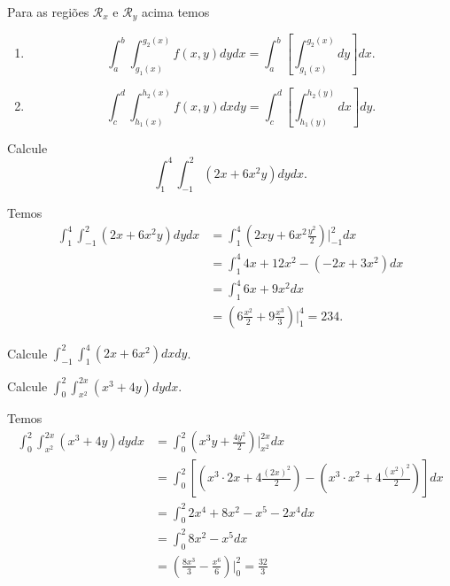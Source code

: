 \begin{definition}
    Para as regiões \(\mathcal{R}_x\) e \(\mathcal{R}_y\) acima temos
        \begin{enumerate}
            \item \[\int_a^b \int_{g_1(x)}^{g_2(x)} f(x,y) dy dx = \int_a^b \left[ \int_{g_1(x)}^{g_2(x)} dy \right] dx.\]
            \item \[\int_c^d \int_{h_1(x)}^{h_2(x)} f(x,y) dx dy = \int_c^d \left[ \int_{h_1(y)}^{h_2(y)} dx \right] dy.\]
        \end{enumerate}
\end{definition}

\begin{example}
    Calcule \[\int_1^4 \int_{-1}^2 (2x + 6x^2y) dy dx.\]


    Temos
        \begin{align*}
            \int_1^4 \int_{-1}^2 (2x + 6x^2y) dy dx
                & = \int_1^4 \left( 2xy + 6x^2\frac{y^2}{2} \right)\bigg|_{-1}^2 dx \\
                & = \int_1^4 4x + 12x^2 - (-2x + 3x^2) dx \\
                & = \int_1^4 6x + 9x^2 dx \\
                & = \left( 6\frac{x^2}{2} + 9\frac{x^3}{3} \right)\bigg|_1^4 = 234.
        \end{align*}
\end{example}

\begin{exercise}
    Calcule \(\int_{-1}^2 \int_1^4 (2x + 6x^2) dxdy\).
\end{exercise}

\begin{example}
    Calcule \(\int_0^2 \int_{x^2}^{2x} (x^3 + 4y) dy dx\).


    Temos
        \begin{align*}
            \int_0^2 \int_{x^2}^{2x} (x^3 + 4y) dy dx
                & = \int_0^2 \left( x^3 y + \frac{4y^2}{2} \right)\bigg|_{x^2}^{2x} dx \\
                & = \int_0^2 \left[ \left( x^3\cdot 2x + 4\frac{(2x)^2}{2} \right) - \left( x^3\cdot x^2 + 4\frac{(x^2)^2}{2} \right) \right] dx \\
                & = \int_0^2 2x^4 + 8x^2 - x^5 - 2x^4 dx \\
                & = \int_0^2 8x^2 - x^5 dx \\
                & = \left( \frac{8x^3}{3} - \frac{x^6}{6} \right)\bigg|_0^2 = \frac{32}{3} 
        \end{align*}
\end{example}

